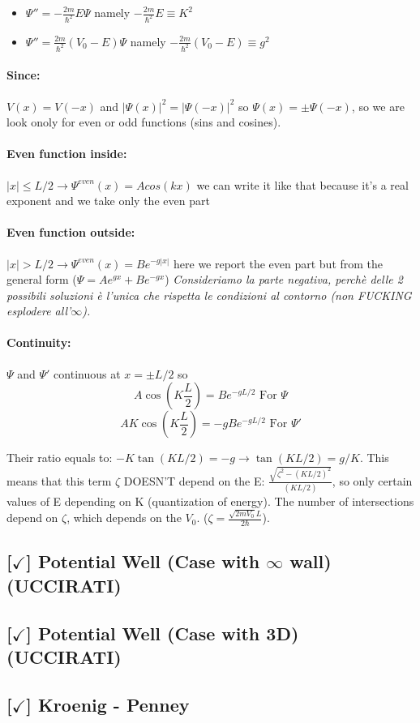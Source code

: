 \begin{itemize}
    \item $\Psi'' = -\frac{2m}{\hbar^2}E\Psi$ namely $-\frac{2m}{\hbar^2}E \equiv K^2$
    \item $\Psi'' = \frac{2m}{\hbar^2}(V_0 -E)\Psi$ namely $-\frac{2m}{\hbar^2}(V_0 -E) \equiv g^2$
\end{itemize}

\paragraph{Since:} $V(x) = V(-x)$ and $|\Psi(x)|^2 = |\Psi(-x)|^2$ so $\Psi(x) = \pm \Psi(-x)$, so we are look onoly for even or odd functions (sins and cosines).

\paragraph{Even function inside:} $|x| \leq L/2 \rightarrow \Psi^{even}(x) = Acos(kx)$ we can write it like that because it's a real exponent and we take only the even part
\paragraph{Even function outside:} $|x| > L/2 \rightarrow \Psi^{even}(x) = B e^{-g|x|}$ here we report the even part but from the general form ($\Psi = Ae^{gx} + Be^{-gx}$) \textit{Consideriamo la parte negativa, perchè delle 2 possibili soluzioni è l'unica che rispetta le condizioni al contorno (non FUCKING esplodere all'$\infty$).}

\paragraph{Continuity:} $\Psi$ and $\Psi'$ continuous at $x=\pm L/2$ so $$A\cos\left(K\frac{L}{2}\right) = Be^{-gL/2} \text{ For }\Psi$$
$$AK\cos\left(K\frac{L}{2}\right) = -gBe^{-gL/2} \text{ For }\Psi'$$

Their ratio equals to: $-K\tan\left(KL/2\right) = -g \rightarrow \tan\left(KL/2\right) = g/K$. This means that this term $\zeta$ DOESN'T depend on the E: $\frac{\sqrt{\zeta^2 - (KL/2)^2}}{(KL/2)}$, so only certain values of E depending on K (quantization of energy). The number of intersections depend on $\zeta$, which depends on the $V_0$. ($\zeta = \frac{\sqrt{2mV_0} L}{2\hbar}$).

\subsection{[$\checkmark$] Potential Well (Case with $\infty$ wall) (UCCIRATI)}
\subsection{[$\checkmark$] Potential Well (Case with 3D) (UCCIRATI)}
\subsection{[$\checkmark$] Kroenig - Penney}


